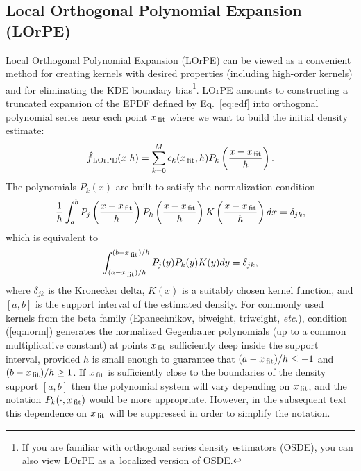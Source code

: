 \documentclass[12pt,titlepage]{article}
\newcommand{\sub}[1]{\ensuremath{_{\mbox{\scriptsize \,#1}}}}
\newcommand{\xf}{x\sub{fit}}
\begin{document}
\subsection{Local Orthogonal Polynomial Expansion (LOrPE)}
\label{sec:lorpe}

Local Orthogonal Polynomial Expansion (LOrPE) can be viewed as
a convenient method
for creating kernels with desired properties (including high-order
kernels) and for eliminating the KDE boundary bias\footnote{If you
are familiar with orthogonal series density estimators (OSDE), you can
also view LOrPE as a~localized version of OSDE.}.
LOrPE amounts to constructing a truncated expansion of the EPDF
defined by Eq.~\ref{eq:edf}
into orthogonal polynomial series near each point $x\sub{fit}$
where we want to build the initial density estimate:
\begin{equation}
\label{eq:expansion}
\hat{f}\sub{LOrPE}(x|h) = \sum_{k=0}^{M}c_{k}(x\sub{fit}, h) P_{k}\left(\frac{x - \xf}{h}\right).
\end{equation}
The polynomials $P_{k}(x)$ are built to satisfy the normalization condition
\begin{equation}\label{eq:norm0}
\frac{1}{h} \int_{a}^{b} P_{j}\left(\frac{x - \xf}{h}\right)P_{k}\left(\frac{x - \xf}{h}\right) K\left(\frac{x - \xf}{h}\right)dx = \delta_{jk},
\end{equation}
which is equivalent to
\begin{equation}
\label{eq:norm}
\int_{(a - x\sub{fit})/h}^{(b - x\sub{fit})/h} P_{j}(y)P_{k}(y)K(y)dy = \delta_{jk},
\end{equation}
where $\delta_{jk}$ is the Kronecker delta,
$K(x)$ is a suitably chosen kernel function,
and $[a, b]$ is the support interval of the estimated density.
For commonly used kernels from
the beta family (Epanechnikov, biweight, triweight, {\it etc}.), condition (\ref{eq:norm})
generates the normalized Gegenbauer polynomials (up to a common multiplicative
constant) at points $\xf$ sufficiently deep inside the support
interval, provided $h$ is small enough to guarantee that
$(a-\xf)/h\leq -1$ and $(b-\xf)/h\geq 1$. 
If $\xf$ is
sufficiently close to the boundaries of the density
support $[a,b]$ then the polynomial system will vary
depending on $\xf$, and the notation
$P_{k}(\cdot,\xf)$ would be more appropriate. However, in the subsequent
text this dependence on $\xf$ will be suppressed in order to simplify
the notation.
\end{document}
